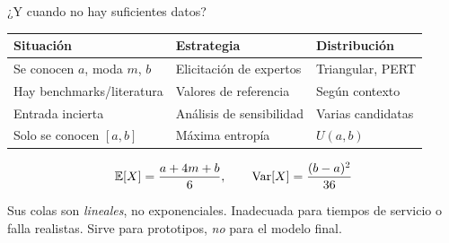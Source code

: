 \documentclass[aspectratio=1610, 10pt]{beamer}
\begin{document}
\begin{frame}{¿Y cuando no hay suficientes datos?}
  \begin{center}\small
    \renewcommand{\arraystretch}{1.2}
    \begin{tabular}{lll}
      \toprule
      \textbf{Situación} & \textbf{Estrategia} & \textbf{Distribución} \\
      \midrule
      Se conocen $a$, moda $m$, $b$ & Elicitación de expertos & Triangular, PERT \\
      Hay benchmarks/literatura & Valores de referencia & Según contexto \\
      Entrada incierta              & Análisis de sensibilidad & Varias candidatas \\
      Solo se conocen $[a,b]$       & Máxima entropía & $U(a,b)$ \\
      \bottomrule
    \end{tabular}
  \end{center}

  \begin{formulabox}
    \[
      \mathbb{E}[X] = \frac{a + 4m + b}{6},\qquad \operatorname{Var}[X] = \frac{(b-a)^2}{36}
    \]
  \end{formulabox}

  \begin{alertabox}
    Sus colas son \emph{lineales}, no exponenciales. Inadecuada para tiempos de servicio
    o falla realistas. Sirve para prototipos, \emph{no} para el modelo final.
  \end{alertabox}
\end{frame}
\end{document}
